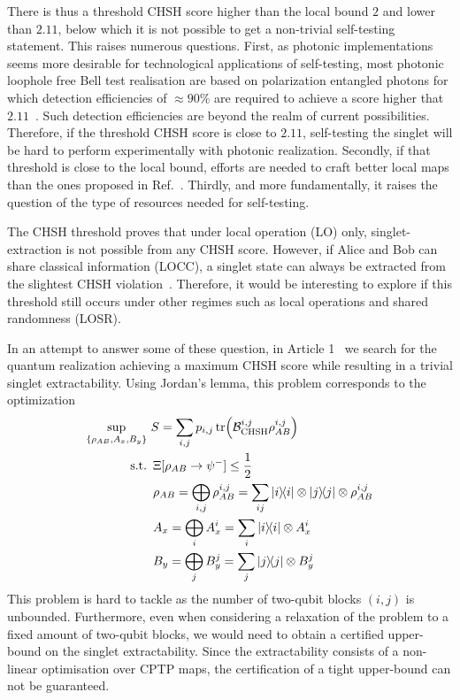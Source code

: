 \medbreak

There is thus a threshold CHSH score higher than the local bound $2$ and lower than $2.11$, below which it is not possible to get a non-trivial self-testing statement.
This raises numerous questions. 
First, as photonic implementations seems more desirable for technological applications of self-testing, most photonic loophole free Bell test realisation are based on polarization entangled photons for which detection efficiencies of $\approx 90\%$ are required to achieve a score higher that $2.11$~\cite{Vivoli2015b}. 
Such detection efficiencies are beyond the realm of current possibilities. 
Therefore, if the threshold CHSH score is close to $2.11$, self-testing the singlet will be hard to perform experimentally with photonic realization.
Secondly, if that threshold is close to the local bound, efforts are needed to craft better local maps than the ones proposed in Ref.~\cite{Kaniewski2016}.
Thirdly, and more fundamentally, it raises the question of the type of resources needed for self-testing.

The CHSH threshold proves that under local operation (LO) only, singlet-extraction is not possible from any CHSH score.
However, if Alice and Bob can share classical information (LOCC), a singlet state can always be extracted from the slightest CHSH violation~\cite{Bardyn2009}. 
Therefore, it would be interesting to explore if this threshold still occurs under other regimes such as local operations and shared randomness (LOSR).

\medbreak

In an attempt to answer some of these question, in Article 1~\cite{Valcarce2020} we search for the quantum realization achieving a maximum CHSH score while resulting in a trivial singlet extractability.
Using Jordan's lemma, this problem corresponds to the optimization
\begin{equation}
	\begin{split}
		\sup_{\{\rho_{AB},A_x,B_y\}}\ &S=\sum_{i,j} p_{i,j} \tr (\mathcal{B}_\text{CHSH}^{i,j} \rho_{AB}^{i,j})\\
\textnormal{s.t.}\ &\,\Xi[\rho_{AB}\rightarrow \psi^-] \leq \frac{1}{2} \\
				   &\, \rho_{AB} = \bigoplus_{i,j} \rho_{AB}^{i,j} = \sum_{ij} \ketbra{i} \otimes \ketbra{j} \otimes \rho_{AB}^{i,j} \\
				   &\, A_x = \bigoplus_{i} A_x^i = \sum_{i} \ketbra{i} \otimes A_x^{i} \\
				   &\, B_y = \bigoplus_{j} B_y^j = \sum_{j} \ketbra{j} \otimes B_y^{j}
	\end{split}
	\label{eq:CHSH_threshold}
\end{equation}
This problem is hard to tackle as the number of two-qubit blocks $(i,j)$ is unbounded.
Furthermore, even when considering a relaxation of the problem to a fixed amount of two-qubit blocks, we would need to obtain a certified upper-bound on the singlet extractability.
Since the extractability consists of a non-linear optimisation over CPTP maps, the certification of a tight upper-bound can not be guaranteed.

